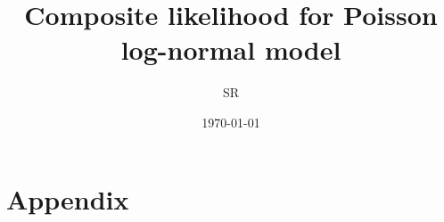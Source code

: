 \documentclass[a4paper, 11pt]{article}
\begin{document}
\title{Composite likelihood for Poisson log-normal model}

\author{SR} 

\date{\today}
\maketitle









\appendix
\section{Appendix}





\end{document}
